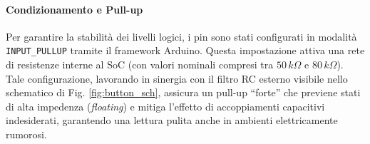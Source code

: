 \paragraph{Condizionamento e Pull-up}
Per garantire la stabilità dei livelli logici, i pin sono stati configurati in modalità \texttt{INPUT\_PULLUP} tramite il framework Arduino. Questa impostazione attiva una rete di resistenze interne al SoC (con valori nominali compresi tra $50\,k\Omega$ e $80\,k\Omega$). Tale configurazione, lavorando in sinergia con il filtro RC esterno visibile nello schematico di Fig. \ref{fig:button_sch}, assicura un pull-up ``forte'' che previene stati di alta impedenza (\textit{floating}) e mitiga l'effetto di accoppiamenti capacitivi indesiderati, garantendo una lettura pulita anche in ambienti elettricamente rumorosi.